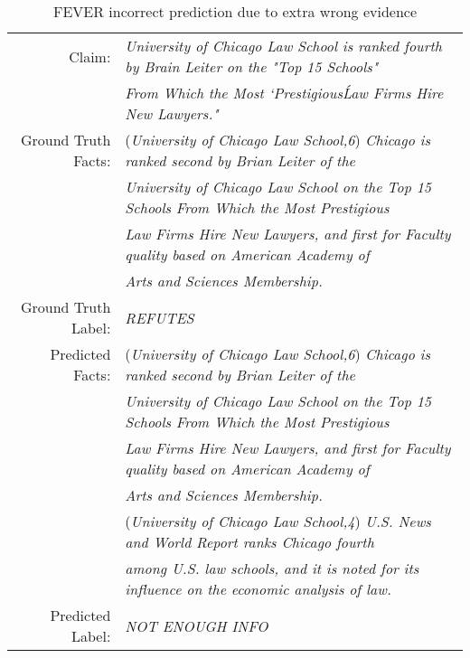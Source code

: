 \documentclass[11pt,a4paper]{article}
\begin{document}
\begin{table*}[t]
\centering
\small
\begin{tabular}{rl}
\toprule
Claim: & \textit{University of Chicago Law School is ranked fourth by Brain Leiter on the "Top 15 Schools" }\\ &   \textit{From Which the Most `Prestigious\' Law Firms Hire New Lawyers."}\\
\midrule

Ground Truth Facts: & (\textit{University of Chicago Law School,6}) \textit{Chicago is ranked second by Brian Leiter of the}\\ & \textit{University of Chicago Law School on the Top 15 Schools From Which the Most Prestigious} \\ & \textit{Law Firms Hire New Lawyers, and first for Faculty quality based on American Academy of}  \\ & \textit{Arts and Sciences Membership.}\\

Ground Truth Label: & \textit{REFUTES}\\
\midrule
Predicted Facts: & (\textit{University of Chicago Law School,6}) \textit{Chicago is ranked second by Brian Leiter of the}\\ & \textit{University of Chicago Law School on the Top 15 Schools From Which the Most Prestigious} \\ & \textit{Law Firms Hire New Lawyers, and first for Faculty quality based on American Academy of}  \\ & \textit{Arts and Sciences Membership.}\\
& (\textit{University of Chicago Law School,4}) \textit{U.S. News and World Report ranks Chicago fourth}\\ & \textit{among U.S. law schools, and it is noted for its influence on the economic analysis of law.}\\

Predicted Label: & \textit{NOT ENOUGH INFO}\\

\bottomrule
\end{tabular}
\caption{FEVER incorrect prediction due to extra wrong evidence}
\label{table:ranker_analysis_5}
\end{table*}
\end{document}
